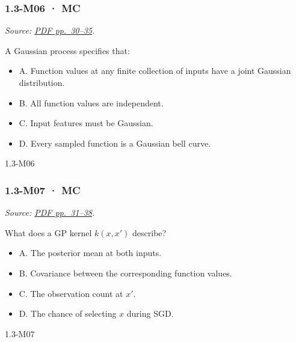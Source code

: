 \noindent\begin{minipage}{\linewidth}

\subsubsection{1.3-M06 · MC}\label{m06-mc-2}

\emph{Source:
\href{../Lecture\%20Slides/1.3.\%20Bayesian\%20Learning.pdf\#page=30}{PDF
pp.~30--35}.}

A Gaussian process specifies that:

\begin{itemize}
\tightlist
\item
  A. Function values at any finite collection of inputs have a joint
  Gaussian distribution.
\item
  B. All function values are independent.
\item
  C. Input features must be Gaussian.
\item
  D. Every sampled function is a Gaussian bell curve.
\end{itemize}

\begin{solution}[8mm]{1.3-M06}

\end{solution}
\end{minipage}\par\medskip

\noindent\begin{minipage}{\linewidth}

\subsubsection{1.3-M07 · MC}\label{m07-mc-2}

\emph{Source:
\href{../Lecture\%20Slides/1.3.\%20Bayesian\%20Learning.pdf\#page=31}{PDF
pp.~31--38}.}

What does a GP kernel \(k(x,x')\) describe?

\begin{itemize}
\tightlist
\item
  A. The posterior mean at both inputs.
\item
  B. Covariance between the corresponding function values.
\item
  C. The observation count at \(x'\).
\item
  D. The chance of selecting \(x\) during SGD.
\end{itemize}

\begin{solution}[8mm]{1.3-M07}

\end{solution}
\end{minipage}\par\medskip

